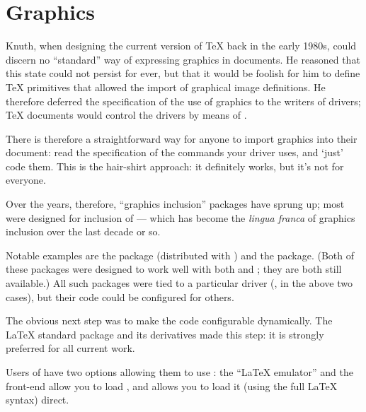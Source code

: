 
\section{Graphics}


Knuth, when designing the current version of \TeX{} back in the early
1980s, could discern no ``standard'' way of expressing graphics in
documents.  He reasoned that this state could not persist for ever,
but that it would be foolish for him to define \TeX{} primitives that
allowed the import of graphical image definitions.  He therefore
deferred the specification of the use of graphics to the writers of
 drivers; \TeX{} documents would control the drivers by
means of %
\nothtml{)}.

There is therefore a straightforward way for anyone to import graphics
into their document: read the specification of the 
commands your driver uses, and `just' code them.  This is the
hair-shirt approach: it definitely works, but it's not for everyone.

Over the years, therefore, ``graphics inclusion'' packages have sprung
up; most were designed for inclusion of
\nothtml{)}\nobreakspace---
which has become the \emph{lingua franca} of graphics inclusion over
the last decade or so.

Notable examples are the  package (distributed with
) and the  package.  (Both of these
packages were designed to work well with both \plaintex{} and
\LaTeXo{}; they are both still available.)  All such packages were
tied to a particular  driver (, in
the above two cases), but their code could be configured for others.

The obvious next step was to make the code configurable dynamically.
The \LaTeX{} standard  package and its derivatives
made this step: it is strongly preferred for all current work.

Users of \plaintex{} have two options allowing them to use
: the  ``\LaTeX{} emulator'' and
the  front-end allow you to load
, and  allows you to load
it (using the full \LaTeX{} syntax) direct.

